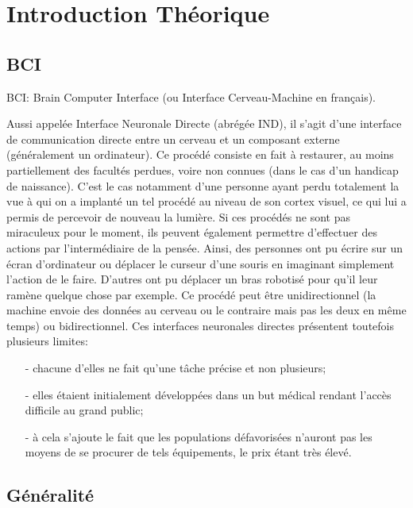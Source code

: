 \part{Introduction Théorique} %
\label{prt:introduction_ _théorique_}
	
	\chapter{BCI} %
	\label{chap:bci}
	
	BCI: Brain Computer Interface (ou Interface Cerveau-Machine en français).
	
	Aussi appelée Interface Neuronale Directe (abrégée IND), il s'agit d'une interface de communication directe entre un cerveau et un composant externe (généralement un ordinateur).
	Ce procédé consiste en fait à restaurer, au moins partiellement des facultés perdues, voire non connues (dans le cas d'un handicap de naissance). C'est le cas notamment d'une personne ayant perdu totalement la vue à qui on a implanté un tel procédé au niveau de son cortex visuel, ce qui lui a permis de percevoir de nouveau la lumière. Si ces procédés ne sont pas miraculeux pour le moment, ils peuvent également permettre d'effectuer des actions par l'intermédiaire de la pensée. Ainsi, des personnes ont pu écrire sur un écran d'ordinateur ou déplacer le curseur d'une souris en imaginant simplement l'action de le faire. D'autres ont pu déplacer un bras robotisé pour qu'il leur ramène quelque chose par exemple.
	Ce procédé peut être unidirectionnel (la machine envoie des données au cerveau ou le contraire mais pas les deux en même temps) ou bidirectionnel.
	Ces interfaces neuronales directes présentent toutefois plusieurs limites:
	\begin{itemize}
		\item [-] chacune d'elles ne fait qu'une tâche précise et non plusieurs;
		\item [-] elles étaient initialement développées dans un but médical rendant l'accès difficile au grand public;
		\item [-] à cela s'ajoute le fait que les populations défavorisées n'auront pas les moyens de se procurer de tels équipements, le prix étant très élevé.
	\end{itemize}

	
	
	

	\chapter{Généralité} %
	\label{chap:généralité}
	
